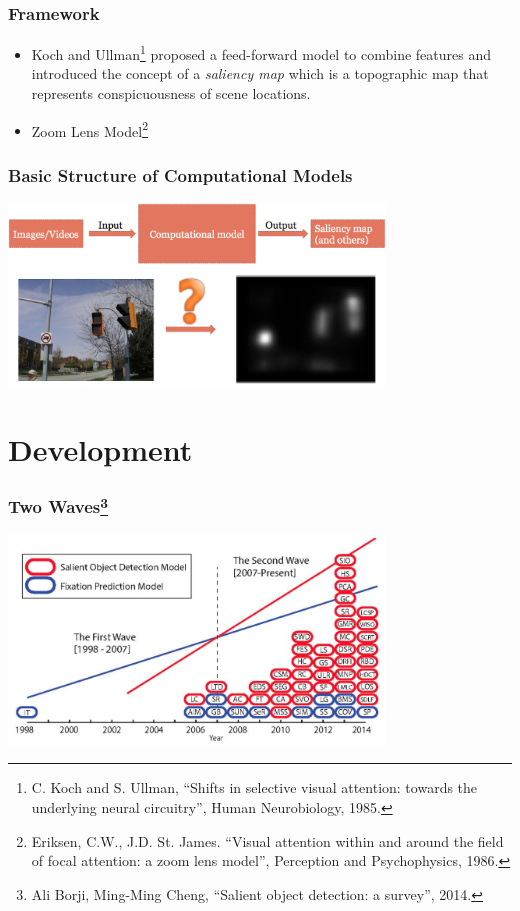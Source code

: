 \documentclass[notheorems,serif,table,compress]{beamer}  %
\begin{document}
\begin{frame}
\frametitle{Framework}
\begin{itemize}
\item Koch and Ullman\footnote{C. Koch and S. Ullman, ``Shifts in selective visual attention: towards the underlying neural circuitry'', Human Neurobiology, 1985.} proposed a feed-forward model to combine features and introduced the concept of a {\color{blue}\emph{saliency map}} which is a topographic map that represents conspicuousness of scene locations.
\item Zoom Lens Model\footnote{Eriksen, C.W., J.D. St. James. ``Visual attention within and around the field of focal attention: a zoom lens model'', Perception and Psychophysics, 1986.}
\end{itemize}
\end{frame}


\begin{frame}
\frametitle{Basic Structure of Computational Models}
\centering\includegraphics[width=10cm]{BasicStructure.jpg}
\end{frame}


\section{Development}

\begin{frame}
\frametitle{Two Waves\footnote{Ali Borji, Ming-Ming Cheng, ``Salient object detection: a survey'', 2014.}}
\centering\includegraphics[width=10cm]{wave}
\end{frame}
\end{document}
